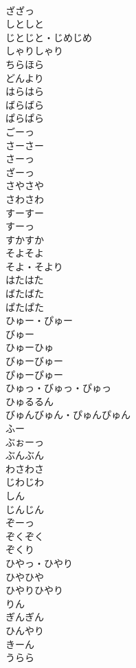 \documentclass[8pt]{extreport}
\begin{document}
\begin{CJK}{UTF8}{min}
\\	ざざっ	
\\	しとしと	
\\	じとじと・じめじめ	
\\	しゃりしゃり	
\\	ちらほら	
\\	どんより	
\\	はらはら	
\\	ばらばら	
\\	ぱらぱら	
\\	ごーっ	
\\	さーさー	
\\	さーっ	
\\	ざーっ	
\\	さやさや	
\\	さわさわ	
\\	すーすー	
\\	すーっ	
\\	すかすか	
\\	そよそよ	
\\	そよ・そより	
\\	はたはた	
\\	ばたばた	
\\	ぱたぱた	
\\	ひゅー・ぴゅー	
\\	びゅー	
\\	ひゅーひゅ	
\\	びゅーびゅー	
\\	ぴゅーぴゅー	
\\	ひゅっ・びゅっ・ぴゅっ	
\\	ひゅるるん	
\\	びゅんびゅん・ぴゅんぴゅん	
\\	ふー	
\\	ぶぉーっ	
\\	ぶんぶん	
\\	わさわさ	
\\	じわじわ	
\\	しん	
\\	じんじん	
\\	ぞーっ	
\\	ぞくぞく	
\\	ぞくり	
\\	ひやっ・ひやり	
\\	ひやひや	
\\	ひやりひやり	
\\	りん	
\\	ぎんぎん	
\\	ひんやり	
\\	きーん	
\\	うらら	

\end{CJK}
\end{document}
